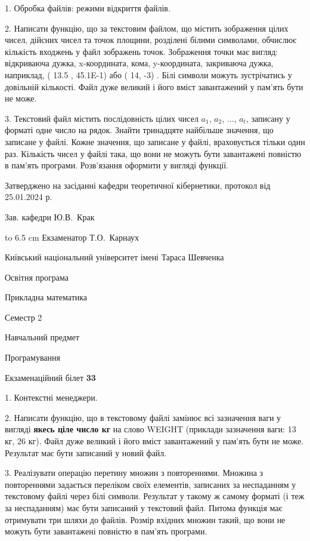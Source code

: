 \documentclass[12pt, ukrainian]{article}
\begin{document}
{%
1. Обробка файлів: режими відкриття файлів.%
\par
2. Написати функцію, що за текстовим файлом, що містить зображення цілих чисел, дійсних чисел та точок площини, розділені білими символами, обчислює кількість входжень у файл зображень точок. Зображення точки має вигляд: відкриваюча дужка, x-координата, кома, y-координата, закриваюча дужка, наприклад, ( 13.5 , 45.1E-1) або ( 14, -3) . Білі символи можуть зустрічатись у довільній кількості. Файл дуже великий і його вміст завантажений у пам'ять бути не може.

\par
3. Текстовий файл містить послідовність цілих чисел $a_1$, $a_2$, $\ldots$, $a_t$, записану у форматі одне число на рядок. Знайти тринадцяте найбільше значення, що записане у файлі. Кожне значення, що записане у файлі, враховується тільки один раз. Кількість чисел у файлі така, що вони не можуть бути завантажені повністю в пам'ять програми. Розв'язання оформити у вигляді функції.

}
{\smallskip\smallskip \begin {scriptsize} Затверджено на засіданні кафедри теоретичної кібернетики, протокол   від   25.01.2024 р.\par\smallskip\smallskip\smallskip\smallskip
{\parbox {6.5 cm} {Зав. кафедри \dotfill Ю.В.~Крак}}\hspace {0.7cm} {\hbox to 6.5 cm { Екзаменатор \dotfill Т.О.~Карнаух}} \end{scriptsize}}
\vspace{0.9cm}
{{\begin {scriptsize}\par
{ \center  Київський національний університет імені Тараса Шевченка \par}
{\parbox {5 cm}{Освітня програма \hfill}{\parbox {7 cm}{Прикладна математика\hfill}}\parbox {6 cm}{\hfill Семестр 2}}\par
{\parbox {5 cm} {Навчальний предмет \hfill}\parbox {7 cm}{Програмування \hfill}\parbox {6cm}{\hfill}\par}\vspace{-15pt} \end{scriptsize}}{\center Екзаменаційний білет \No \textbf { 33 }\par}}
{%
1. Контекстні менеджери.%
\par
2. Написати функцію, що в текстовому файлі замінює всі зазначення ваги у вигляді \textbf{якесь ціле число кг} на слово WEIGHT (приклади зазначення ваги: 13 кг, 26   кг). Файл дуже великий і його вміст завантажений у пам'ять бути не може. Результат має бути записаний у новий файл.

\par
3. Реалізувати операцію перетину множин з повтореннями. Множина з повтореннями задається переліком своїх елементів, записаних за неспаданням у текстовому файлі через білі символи. Результат у такому ж самому форматі (і теж за неспаданням) має бути записаний у текстовий файл. Питома функція має отримувати три шляхи до файлів. Розмір вхідних множин такий, що вони не можуть бути завантажені повністю в пам’ять програми.

}
\end{document}
